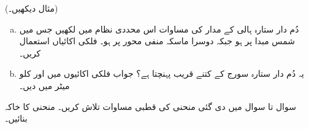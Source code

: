  (مثال  دیکھیں۔)\\
\begin{enumerate}[a.]
\item
دُم دار ستارہ ہالی کے مدار کی مساوات اس محددی نظام میں لکھیں جس میں شمس مبدا پر ہو جبکہ دوسرا ماسکہ منفی محور  پر ہو۔ فلکی اکائیاں استعمال کریں۔
\item 
یہ دُم دار ستارہ سورج کے کتنے قریب پہنچتا ہے؟ جواب فلکی اکائیوں میں اور کلو میٹر میں دیں۔
\end{enumerate}

سوال  تا سوال  میں دی گئی منحنی کی قطبی مساوات تلاش کریں۔ منحنی کا خاکہ بنائیں۔

